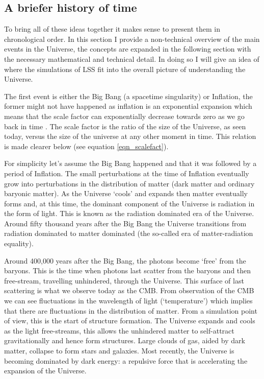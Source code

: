 \subsection{A briefer history of time}
To bring all of these ideas together it makes sense to present them in chronological order. In this section I provide a non-technical overview of the main events in the Universe, the concepts are expanded in the following section with the necessary mathematical and technical detail. In doing so I will give an idea of where the simulations of LSS fit into the overall picture of understanding the Universe.

The first event is either the Big Bang (a spacetime singularity) or Inflation, the former might not have happened as inflation is an exponential expansion which means that the scale factor can exponentially decrease towards zero as we go back in time \citep{bib_pea}. The scale factor is the ratio of the size of the Universe, as seen today, versus the size of the universe at any other moment in time. This relation is made clearer below (see equation \ref{eqn_scalefact}).

For simplicity let's assume the Big Bang happened and that it was followed by a period of Inflation. The small perturbations at the time of Inflation eventually grow into perturbations in the distribution of matter (dark matter and ordinary baryonic matter). As the Universe `cools' and expands then matter eventually forms and, at this time, the dominant component of the Universe is radiation in the form of light. This is known as the radiation dominated era of the Universe. Around fifty thousand years after the Big Bang the Universe transitions from radiation dominated to matter dominated (the so-called era of matter-radiation equality).

Around 400,000 years after the Big Bang, the photons become `free' from the baryons. This is the time when photons last scatter from the baryons and then free-stream, travelling unhindered, through the Universe. This surface of last scattering is what we observe today as the CMB. From observation of the CMB we can see fluctuations in the wavelength of light (`temperature') which implies that there are fluctuations in the distribution of matter. From a simulation point of view, this is the start of structure formation. The Universe expands and cools as the light free-streams, this allows the unhindered matter to self-attract gravitationally and hence form structures. Large clouds of gas, aided by dark matter, collapse to form stars and galaxies. Most recently, the Universe is becoming dominated by dark energy: a repulsive force that is accelerating the expansion of the Universe.

